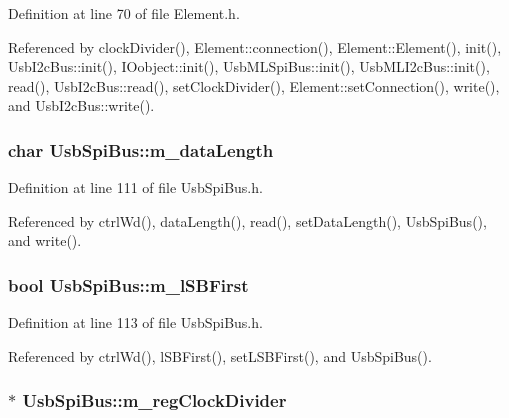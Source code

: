 Definition at line 70 of file Element.h.

Referenced by clockDivider(), Element::connection(), Element::Element(), init(), UsbI2cBus::init(), IOobject::init(), UsbMLSpiBus::init(), UsbMLI2cBus::init(), read(), UsbI2cBus::read(), setClockDivider(), Element::setConnection(), write(), and UsbI2cBus::write().\hypertarget{classUsbSpiBus_a2d8b2bddd6d4d5dc53c38b5698737c5c}{
\subsubsection[{m\_\-dataLength}]{\setlength{\rightskip}{0pt plus 5cm}char {\bf UsbSpiBus::m\_\-dataLength}}}
\label{classUsbSpiBus_a2d8b2bddd6d4d5dc53c38b5698737c5c}


Definition at line 111 of file UsbSpiBus.h.

Referenced by ctrlWd(), dataLength(), read(), setDataLength(), UsbSpiBus(), and write().\hypertarget{classUsbSpiBus_a23011787b0425356b011bc7a1c7cff5b}{
\subsubsection[{m\_\-lSBFirst}]{\setlength{\rightskip}{0pt plus 5cm}bool {\bf UsbSpiBus::m\_\-lSBFirst}}}
\label{classUsbSpiBus_a23011787b0425356b011bc7a1c7cff5b}


Definition at line 113 of file UsbSpiBus.h.

Referenced by ctrlWd(), lSBFirst(), setLSBFirst(), and UsbSpiBus().\hypertarget{classUsbSpiBus_abfd5f040a0a8c19d972b26ea581bf1f0}{
\subsubsection[{m\_\-regClockDivider}]{$\ast$ {\bf UsbSpiBus::m\_\-regClockDivider}}}
\label{classUsbSpiBus_abfd5f040a0a8c19d972b26ea581bf1f0}


